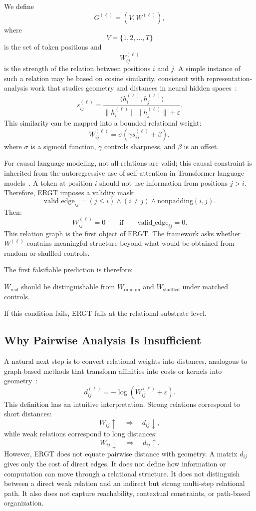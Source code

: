 \documentclass[11pt]{article}
\begin{document}
We define
\[
G^{(\ell)}=(V,W^{(\ell)}),
\]
where
\[
V=\{1,2,\ldots,T\}
\]
is the set of token positions and
\[
W_{ij}^{(\ell)}
\]
is the strength of the relation between positions $i$ and $j$. A simple instance of such a relation may be based on cosine similarity, consistent with representation-analysis work that studies geometry and distances in neural hidden spaces~\cite{hewitt2019structural,alain2017understanding}:
\[
s_{ij}^{(\ell)}
=
\frac{
\langle h_i^{(\ell)},h_j^{(\ell)}\rangle
}{
\|h_i^{(\ell)}\|\|h_j^{(\ell)}\|+\varepsilon
}.
\]
This similarity can be mapped into a bounded relational weight:
\[
W_{ij}^{(\ell)}
=
\sigma(\gamma s_{ij}^{(\ell)}+\beta),
\]
where $\sigma$ is a sigmoid function, $\gamma$ controls sharpness, and $\beta$ is an offset.

For causal language modeling, not all relations are valid; this causal constraint is inherited from the autoregressive use of self-attention in Transformer language models~\cite{vaswani2017attention}. A token at position $i$ should not use information from positions $j>i$. Therefore, ERGT imposes a validity mask:
\[
\mathrm{valid\_edge}_{ij}
=
(j\leq i)
\land
(i\neq j)
\land
\mathrm{nonpadding}(i,j).
\]
Then:
\[
W_{ij}^{(\ell)}=0
\qquad
\text{if}
\qquad
\mathrm{valid\_edge}_{ij}=0.
\]
This relation graph is the first object of ERGT. The framework asks whether $W^{(\ell)}$ contains meaningful structure beyond what would be obtained from random or shuffled controls.

The first falsifiable prediction is therefore:
\begin{ergtclaim}
$W_{\mathrm{real}}$ should be distinguishable from $W_{\mathrm{random}}$ and $W_{\mathrm{shuffled}}$ under matched controls.
\end{ergtclaim}
If this condition fails, ERGT fails at the relational-substrate level.

\subsection{Why Pairwise Analysis Is Insufficient}

A natural next step is to convert relational weights into distances, analogous to graph-based methods that transform affinities into costs or kernels into geometry~\cite{chung1997spectral,bronstein2021geometric}:
\[
d_{ij}^{(\ell)}
=
-\log(W_{ij}^{(\ell)}+\varepsilon).
\]
This definition has an intuitive interpretation. Strong relations correspond to short distances:
\[
W_{ij}\uparrow
\quad\Rightarrow\quad
d_{ij}\downarrow,
\]
while weak relations correspond to long distances:
\[
W_{ij}\downarrow
\quad\Rightarrow\quad
d_{ij}\uparrow.
\]
However, ERGT does not equate pairwise distance with geometry. A matrix $d_{ij}$ gives only the cost of direct edges. It does not define how information or computation can move through a relational structure. It does not distinguish between a direct weak relation and an indirect but strong multi-step relational path. It also does not capture reachability, contextual constraints, or path-based organization.
\end{document}
